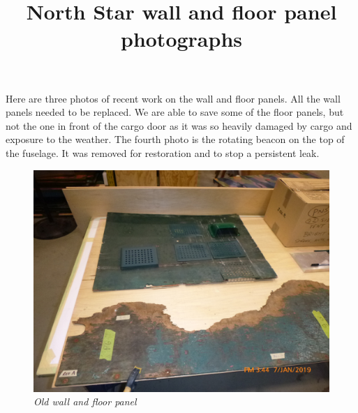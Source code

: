 %


\title{North Star wall and floor panel photographs}

\maketitle


Here are three photos of recent work on the wall and floor panels.  All the
wall
panels needed to be replaced.  We are able to save some of the floor panels,
but not the one in front of the cargo door as it was so heavily
damaged by cargo and exposure to the weather.  The fourth photo is the rotating
beacon on the top of the fuselage.  It was removed for restoration and to stop
a persistent leak.

\begin{figure}[httb]
   \vspace{2em}
   \centering
   \includegraphics[scale=0.5]{OldWallandFloorPanel-scaled.png}
   \caption*{\small \em Old wall and floor panel}
   \label{fig:wall-one}
\end{figure}

